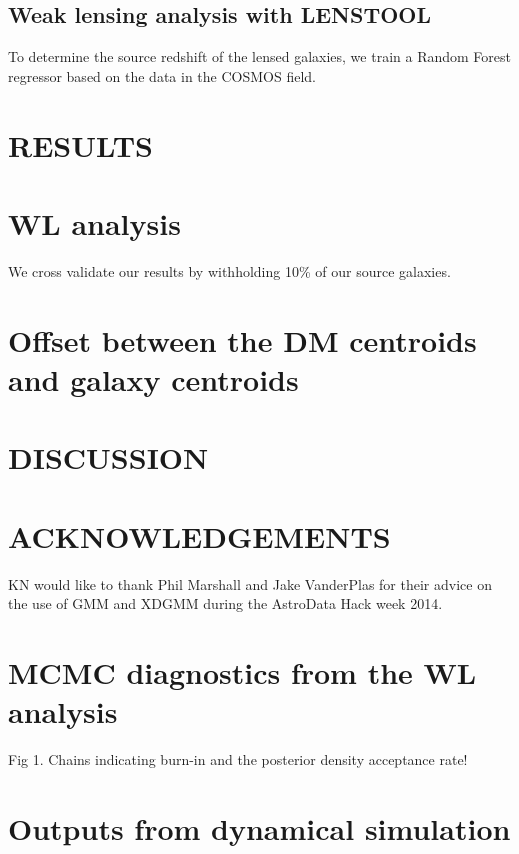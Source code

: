 \documentclass[letterpaper,useAMS,usenatbib]{mn2e}
\begin{document}
\subsection{Weak lensing analysis with LENSTOOL}
To determine the source redshift of the lensed galaxies, we train a Random
Forest regressor based on the data in the COSMOS field. 
\section{RESULTS}
\section{WL analysis}

We cross validate our results by withholding 10\% of our source galaxies. 



\section{Offset between the DM centroids and galaxy centroids}
\section{DISCUSSION}
\section{ACKNOWLEDGEMENTS}
KN would like to thank Phil Marshall and Jake VanderPlas for their advice on the use of GMM and
XDGMM during the AstroData Hack week 2014.



\appendix
\section{MCMC diagnostics from the WL analysis}
Fig 1. Chains indicating burn-in and the posterior density 
acceptance rate!


\section{Outputs from dynamical simulation}
\clearpage\bsp\label{lastpage} 
\end{document}
